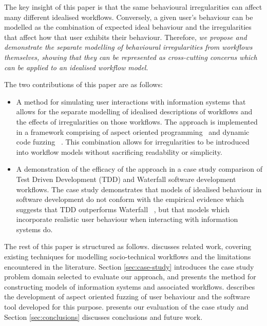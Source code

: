 \documentclass{llncs}
\begin{document}
The key insight of this paper is that the same behavioural irregularities can affect many different idealised
workflows.  Conversely, a given user's behaviour can be modelled as the combination of expected ideal behaviour and the
irregularities that affect how that user exhibits their behaviour.  Therefore, \emph{we propose and demonstrate the
  separate modelling of behavioural irregularities from workflows themselves, showing that they can be represented as
  cross-cutting concerns which can be applied to an idealised workflow model}.

The two contributions of this paper are as follows:

\begin{itemize}

\item A method for simulating user interactions with information systems that allows for the separate modelling of
  idealised descriptions of workflows and the effects of irregularities on those
  workflows.  The approach is implemented in a framework comprising of aspect oriented
  programming~\cite{filman01aspect} and dynamic code fuzzing
 ~\citep{takanen08fuzzing}.  This combination allows for irregularities to be introduced into workflow models
  without sacrificing readability
  or simplicity.

\item A demonstration of the efficacy of the approach in a case study comparison of Test Driven Development (TDD) and
  Waterfall software development workflows.  The case study demonstrates that models of idealised behaviour in software
  development do not conform with the empirical evidence which suggests that TDD outperforms Waterfall
 ~\citep{Bhat2006TestDrivenDevelopment,George2004TestDrivenDevelopment,Huang2009EmpiricalTestFirstProgramming}, but that
  models which incorporate realistic user behaviour when interacting with information systems do.

\end{itemize}

The rest of this paper is structured as follows.   discusses related work, covering existing
techniques for modelling socio-technical workflows and the limitations encountered in the literature.  Section
\ref{sec:case-study} introduces the case study problem domain selected to evaluate our approach, and presents the method
for constructing models of information systems and associated workflows.  describes the development of
aspect oriented fuzzing of user behaviour and the software tool developed for this purpose.  
presents our evaluation of the case study and Section \ref{sec:conclusions} discusses conclusions and future work.
\end{document}
